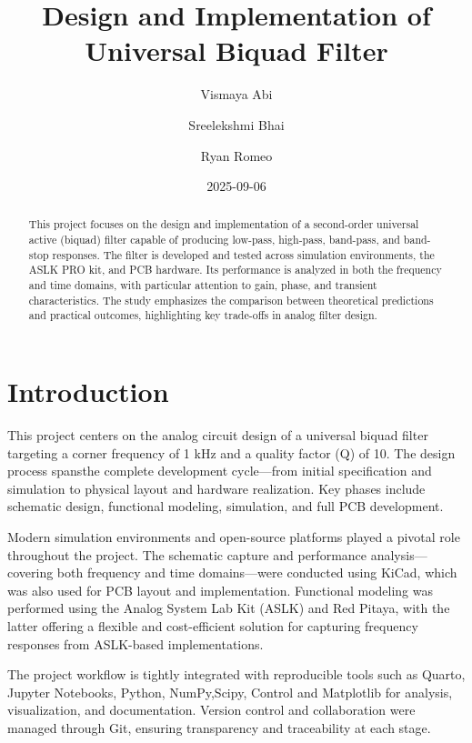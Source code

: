 \documentclass[
  letterpaper,
  DIV=11,
  numbers=noendperiod]{scrreprt}
\title{Design and Implementation of Universal Biquad Filter}
\author{Vismaya Abi \and Sreelekshmi Bhai \and Ryan Romeo}
\date{2025-09-06}
\renewcommand*\contentsname{Table of contents}
\newcommand\contentsname{Table of contents}
\begin{document}
\maketitle
\begin{abstract}
This project focuses on the design and implementation of a second-order
universal active (biquad) filter capable of producing low-pass,
high-pass, band-pass, and band-stop responses. The filter is developed
and tested across simulation environments, the ASLK PRO kit, and PCB
hardware. Its performance is analyzed in both the frequency and time
domains, with particular attention to gain, phase, and transient
characteristics. The study emphasizes the comparison between theoretical
predictions and practical outcomes, highlighting key trade-offs in
analog filter design.
\end{abstract}

\renewcommand*\contentsname{Table of contents}
{
\hypersetup{linkcolor=}
\setcounter{tocdepth}{2}
\tableofcontents
}

\chapter{Introduction}\label{introduction}

This project centers on the analog circuit design of a universal biquad
filter targeting a corner frequency of 1 kHz and a quality factor (Q) of
10. The design process spansthe complete development cycle---from
initial specification and simulation to physical layout and hardware
realization. Key phases include schematic design, functional modeling,
simulation, and full PCB development.

Modern simulation environments and open-source platforms played a
pivotal role throughout the project. The schematic capture and
performance analysis---covering both frequency and time domains---were
conducted using KiCad, which was also used for PCB layout and
implementation. Functional modeling was performed using the Analog
System Lab Kit (ASLK) and Red Pitaya, with the latter offering a
flexible and cost-efficient solution for capturing frequency responses
from ASLK-based implementations.

The project workflow is tightly integrated with reproducible tools such
as Quarto, Jupyter Notebooks, Python, NumPy,Scipy, Control and
Matplotlib for analysis, visualization, and documentation. Version
control and collaboration were managed through Git, ensuring
transparency and traceability at each stage.
\end{document}
